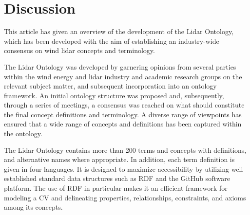 \documentclass[remotesensing,article,submit,pdftex,moreauthors]{Definitions/mdpi}
\begin{document}


\newpage
\section{Discussion}
\label{sec:Discussion}
This article has given an overview of the development of the Lidar Ontology, which has been developed with the aim of establishing an industry-wide consensus on wind lidar concepts and terminology. 

The Lidar Ontology was developed by garnering opinions from several parties within the wind energy and lidar industry and academic research groups on the relevant subject matter, and subsequent incorporation into an ontology framework. 
An initial ontology structure was proposed and, subsequently, through a series of meetings, a consensus was reached on what should constitute the final concept definitions and terminology.
A diverse range of viewpoints has ensured that a wide range of concepts and definitions has been captured within the ontology. 

The Lidar Ontology contains more than 200 terms and concepts with definitions, and alternative names where appropriate. In addition, each term definition is given in four languages. 
It is designed to maximize accessibility by utilizing well-established standard data structures such as RDF and the GitHub software platform. The use of RDF in particular makes it an efficient framework for modeling a CV and delineating properties, relationships, constraints, and axioms among its concepts.
\end{document}
